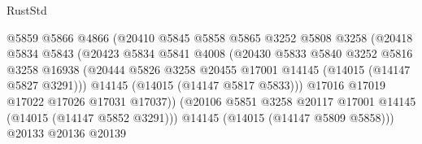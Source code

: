 \begin{lexlean}{RustStd}
\begin{coremodule}
                                      @5859
                                      @5866
                                      @4866
                                      (@20410
                                        @5845
                                        @5858
                                        @5865
                                        @3252
                                        @5808
                                        @3258
                                        (@20418
                                          @5834
                                          @5843
                                          (@20423
                                            @5834
                                            @5841
                                            @4008
                                            (@20430
                                              @5833
                                              @5840
                                              @3252
                                              @5816
                                              @3258
                                              @16938
                                              (@20444
                                                @5826
                                                @3258
                                                @20455
                                                @17001
                                                @14145
                                                (@14015 (@14147 @5827 @3291)))
                                              @14145
                                              (@14015 (@14147 @5817 @5833)))
                                            @17016
                                            @17019
                                            @17022
                                            @17026
                                            @17031
                                            @17037))
                                        (@20106
                                          @5851
                                          @3258
                                          @20117
                                          @17001
                                          @14145
                                          (@14015 (@14147 @5852 @3291)))
                                        @14145
                                        (@14015 (@14147 @5809 @5858)))
                                      @20133
                                      @20136
                                      @20139

\end{coremodule}
\end{lexlean}
